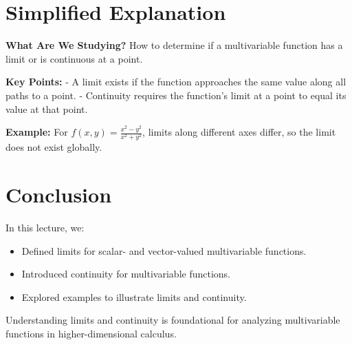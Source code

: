 \documentclass{article}
\begin{document}
\section*{Simplified Explanation}

\textbf{What Are We Studying?}
How to determine if a multivariable function has a limit or is continuous at a point.

\textbf{Key Points:}
- A limit exists if the function approaches the same value along all paths to a point.
- Continuity requires the function's limit at a point to equal its value at that point.

\textbf{Example:}
For $f(x, y) = \frac{x^2 - y^2}{x^2 + y^2}$, limits along different axes differ, so the limit does not exist globally.

\section*{Conclusion}

In this lecture, we:
\begin{itemize}
  \item Defined limits for scalar- and vector-valued multivariable functions.
  \item Introduced continuity for multivariable functions.
  \item Explored examples to illustrate limits and continuity.
\end{itemize}

Understanding limits and continuity is foundational for analyzing multivariable functions in higher-dimensional calculus.
\end{document}
